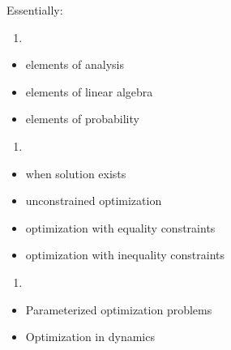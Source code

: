 \documentclass[letterpaper,10pt,english]{jupyterBook}
\begin{document}
\sphinxAtStartPar
Essentially:
\begin{enumerate}
%
\item {} 
\sphinxAtStartPar
{}

\end{enumerate}
\begin{itemize}
\item {} 
\sphinxAtStartPar
elements of analysis

\item {} 
\sphinxAtStartPar
elements of linear algebra

\item {} 
\sphinxAtStartPar
elements of probability

\end{itemize}
\begin{enumerate}
%
\setcounter{enumi}{1}
\item {} 
\sphinxAtStartPar
{}

\end{enumerate}
\begin{itemize}
\item {} 
\sphinxAtStartPar
when solution exists

\item {} 
\sphinxAtStartPar
unconstrained optimization

\item {} 
\sphinxAtStartPar
optimization with equality constraints

\item {} 
\sphinxAtStartPar
optimization with inequality constraints

\end{itemize}
\begin{enumerate}
%
\setcounter{enumi}{2}
\item {} 
\sphinxAtStartPar
{}

\end{enumerate}
\begin{itemize}
\item {} 
\sphinxAtStartPar
Parameterized optimization problems

\item {} 
\sphinxAtStartPar
Optimization in dynamics

\end{itemize}
\end{document}
